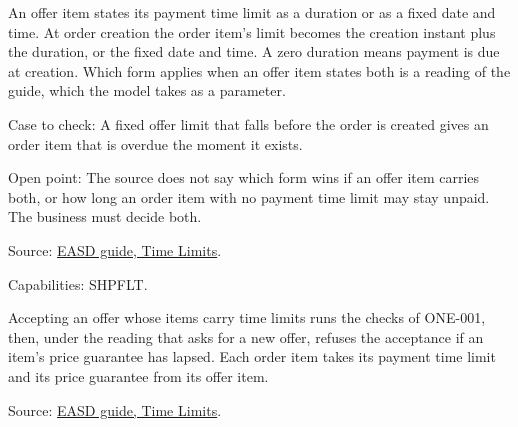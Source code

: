 \begin{definition}
  \label{def:offers-payment-limit-at-creation}
  An offer item states its payment time limit as a duration or as a fixed
  date and time. At order creation the order item's limit becomes the
  creation instant plus the duration, or the fixed date and time. A zero
  duration means payment is due at creation. Which form applies when an
  offer item states both is a reading of the guide, which the model takes
  as a parameter.

  Case to check: A fixed offer limit that falls before the order is created
  gives an order item that is overdue the moment it exists.

  Open point: The source does not say which form wins if an offer item
  carries both, or how long an order item with no payment time limit may
  stay unpaid. The business must decide both.

  Source: \href{https://standards.atlassian.net/wiki/spaces/EASD/pages/574423066/Time+Limits}{EASD guide, Time Limits}.

  Capabilities: SHPFLT.
\end{definition}

\begin{definition}
  \label{def:offers-create-order}
  Accepting an offer whose items carry time limits runs the checks of
  ONE-001, then, under the reading that asks for a new offer, refuses the
  acceptance if an item's price guarantee has lapsed. Each order item takes
  its payment time limit and its price guarantee from its offer item.

  Source: \href{https://standards.atlassian.net/wiki/spaces/EASD/pages/574423066/Time+Limits}{EASD guide, Time Limits}.
\end{definition}

